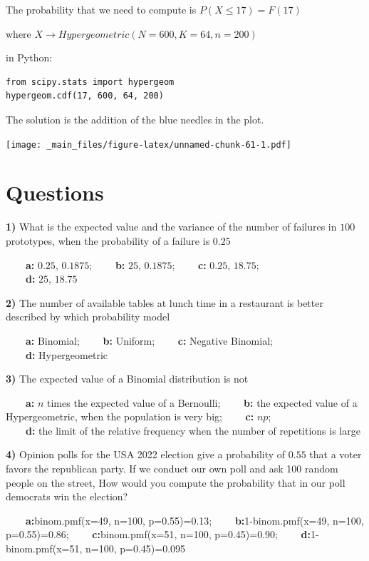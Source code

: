 \documentclass[
]{book}
\begin{document}
The probability that we need to compute is
\(P(X \leq 17)=F(17)\)

where \(X \rightarrow Hypergeometric(N=600,K=64,n=200)\)

in Python:

\begin{verbatim}
from scipy.stats import hypergeom
hypergeom.cdf(17, 600, 64, 200)
\end{verbatim}

The solution is the addition of the blue needles in the plot.

\texttt{[image: \_main\_files/figure-latex/unnamed-chunk-61-1.pdf]}

\hypertarget{questions-4}{%
\section{Questions}\label{questions-4}}

\textbf{1)} What is the expected value and the variance of the number of failures in \(100\) prototypes, when the probability of a failure is \(0.25\)

\textbf{\(\qquad\)a:} \(0.25\), \(0.1875\);
\textbf{\(\qquad\)b:} \(25\), \(0.1875\);
\textbf{\(\qquad\)c:} \(0.25\), \(18.75\);\\
\textbf{\(\qquad\)d:} \(25\), \(18.75\)

\textbf{2)} The number of available tables at lunch time in a restaurant is better described by which probability model

\textbf{\(\qquad\)a:} Binomial;
\textbf{\(\qquad\)b:} Uniform;
\textbf{\(\qquad\)c:} Negative Binomial;\\
\textbf{\(\qquad\)d:} Hypergeometric

\textbf{3)} The expected value of a Binomial distribution is not

\textbf{\(\qquad\)a:} \(n\) times the expected value of a Bernoulli;
\textbf{\(\qquad\)b:} the expected value of a Hypergeometric, when the population is very big;
\textbf{\(\qquad\)c:} \(np\);\\
\textbf{\(\qquad\)d:} the limit of the relative frequency when the number of repetitions is large

\textbf{4)} Opinion polls for the USA 2022 election give a probability of \(0.55\) that a voter favors the republican party. If we conduct our own poll and ask 100 random people on the street, How would you compute the probability that in our poll democrats win the election?

\textbf{\(\qquad\)a:}binom.pmf(x=49, n=100, p=0.55)=0.13;
\textbf{\(\qquad\)b:}1-binom.pmf(x=49, n=100, p=0.55)=0.86;
\textbf{\(\qquad\)c:}binom.pmf(x=51, n=100, p=0.45)=0.90; \textbf{\(\qquad\)d:}1-binom.pmf(x=51, n=100, p=0.45)=0.095
\end{document}
